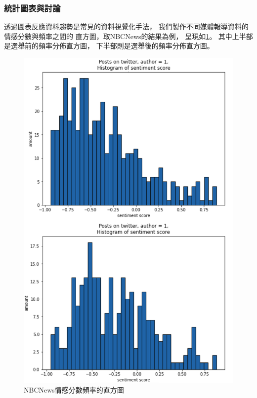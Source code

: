 \documentclass[12pt,twocolumn,letterpaper]{article}
\begin{document}
\subsubsection{統計圖表與討論}
透過圖表反應資料趨勢是常見的資料視覺化手法，
我們製作不同媒體報導資料的情感分數與頻率之間的
直方圖，取NBCNews的結果為例，
呈現如\cref{fig:hist}。
其中上半部是選舉前的頻率分佈直方圖，
下半部則是選舉後的頻率分佈直方圖。
\begin{figure}[h!]
    \centering
    \includegraphics[width=0.8\linewidth]{Figure/histogram.png}
    \caption{NBCNews情感分數頻率的直方圖}
    \label{fig:hist}
\end{figure}
\end{document}
